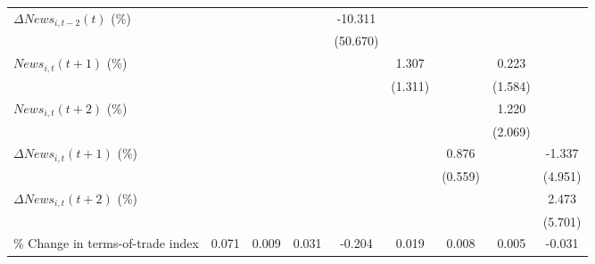 {\begin{tabular}{l*{8}{c}}
\addlinespace
$ \Delta News_{i,t-2}(t)$ (\%)&                     &                     &                     &     -10.311         &                     &                     &                     &                     \\
                    &                     &                     &                     &    (50.670)         &                     &                     &                     &                     \\
\addlinespace
$ News_{i,t}(t+1)$ (\%)&                     &                     &                     &                     &       1.307         &                     &       0.223         &                     \\
                    &                     &                     &                     &                     &     (1.311)         &                     &     (1.584)         &                     \\
\addlinespace
$ News_{i,t}(t+2)$ (\%)&                     &                     &                     &                     &                     &                     &       1.220         &                     \\
                    &                     &                     &                     &                     &                     &                     &     (2.069)         &                     \\
\addlinespace
$ \Delta News_{i,t}(t+1)$ (\%)&                     &                     &                     &                     &                     &       0.876         &                     &      -1.337         \\
                    &                     &                     &                     &                     &                     &     (0.559)         &                     &     (4.951)         \\
\addlinespace
$ \Delta News_{i,t}(t+2)$ (\%)&                     &                     &                     &                     &                     &                     &                     &       2.473         \\
                    &                     &                     &                     &                     &                     &                     &                     &     (5.701)         \\
\addlinespace
\% Change in terms-of-trade index&       0.071         &       0.009         &       0.031         &      -0.204         &       0.019         &       0.008         &       0.005         &      -0.031         \\

\end{tabular}}
